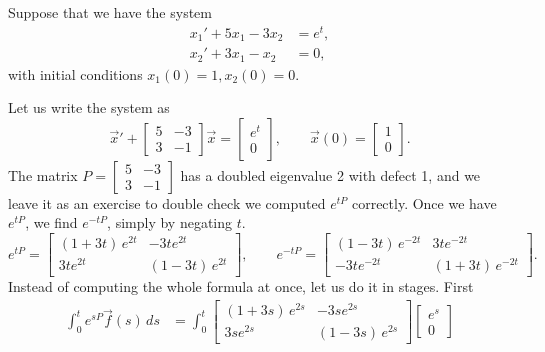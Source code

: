 \begin{example}
Suppose that we have the system
\begin{align*}
x_1' + 5x_1 - 3x_2 &= e^t , \\
x_2' + 3x_1 - x_2 &= 0 ,
\end{align*}
with initial conditions $x_1(0) = 1, x_2(0) = 0$.

Let us write the system as
\begin{equation*}
{\vec{x}}' +
\begin{bmatrix} 5 & -3 \\ 3 & -1 \end{bmatrix}
\vec{x} =
\begin{bmatrix} e^t \\ 0 \end{bmatrix} ,
\qquad
\vec{x}(0) = 
\begin{bmatrix} 1 \\ 0 \end{bmatrix} .
\end{equation*}
The matrix
$P = \left[
\begin{smallmatrix} 5 & -3 \\ 3 & -1 \end{smallmatrix} \right]$
has a doubled eigenvalue 2 with defect 1, and we leave it as an exercise
to double check we computed $e^{tP}$ correctly.  Once we have
$e^{tP}$, we find $e^{-tP}$, simply by negating $t$.
\begin{equation*}
e^{tP} = 
\begin{bmatrix}
(1+3t)\,e^{2t} & -3te^{2t} \\
3te^{2t} & (1-3t)\,e^{2t}
\end{bmatrix}
, \qquad
e^{-tP} = 
\begin{bmatrix}
(1-3t)\,e^{-2t} & 3te^{-2t} \\
-3te^{-2t} & (1+3t)\,e^{-2t}
\end{bmatrix}
.
\end{equation*}
Instead of computing the whole formula at once, let us do it in stages.
First
\begin{equation*}
\begin{split}
\int_0^t e^{sP}\vec{f}(s) \, ds & = 
\int_0^t
 \begin{bmatrix}
 (1+3s)\,e^{2s} & -3se^{2s} \\
 3se^{2s} & (1-3s)\,e^{2s}
 \end{bmatrix}
 \begin{bmatrix} e^{s} \\ 0 \end{bmatrix}

\end{split}
\end{equation*}
\end{example}
